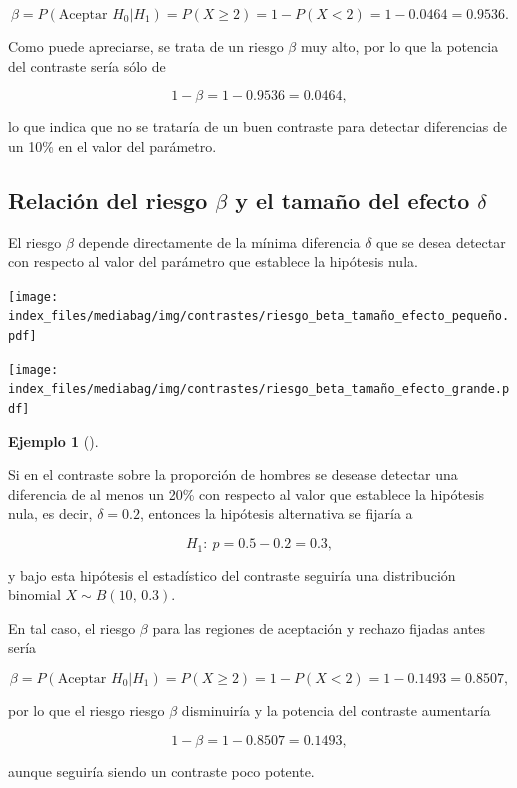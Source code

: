 \documentclass[
  a4paper,
]{scrreport}
\theoremstyle{plain}
\theoremstyle{definition}
\newtheorem{example}{Ejemplo}[chapter]
\theoremstyle{definition}
\theoremstyle{remark}
\begin{document}
\[\beta = P(\mbox{Aceptar }H_0|H_1) = P(X\geq 2) = 1 - P(X<2) = 1-0.0464 = 0.9536.\]

Como puede apreciarse, se trata de un riesgo \(\beta\) muy alto, por lo
que la potencia del contraste sería sólo de

\[1-\beta = 1-0.9536 = 0.0464,\]

lo que indica que no se trataría de un buen contraste para detectar
diferencias de un 10\% en el valor del parámetro.

\subsection{\texorpdfstring{Relación del riesgo \(\beta\) y el tamaño
del efecto
\(\delta\)}{Relación del riesgo \textbackslash beta y el tamaño del efecto \textbackslash delta}}\label{relaciuxf3n-del-riesgo-beta-y-el-tamauxf1o-del-efecto-delta}

El riesgo \(\beta\) depende directamente de la mínima diferencia
\(\delta\) que se desea detectar con respecto al valor del parámetro que
establece la hipótesis nula.

\begin{center}
\texttt{[image: index\_files/mediabag/img/contrastes/riesgo\_beta\_tamaño\_efecto\_pequeño.pdf]}
\end{center}

\begin{center}
\texttt{[image: index\_files/mediabag/img/contrastes/riesgo\_beta\_tamaño\_efecto\_grande.pdf]}
\end{center}

\begin{example}[]\protect\hypertarget{exm-potencia-contraste}{}\label{exm-potencia-contraste}

Si en el contraste sobre la proporción de hombres se desease detectar
una diferencia de al menos un 20\% con respecto al valor que establece
la hipótesis nula, es decir, \(\delta=0.2\), entonces la hipótesis
alternativa se fijaría a

\[H_1:\ p=0.5-0.2=0.3,\]

y bajo esta hipótesis el estadístico del contraste seguiría una
distribución binomial \(X\sim B(10,\,0.3)\).

En tal caso, el riesgo \(\beta\) para las regiones de aceptación y
rechazo fijadas antes sería

\[\beta = P(\mbox{Aceptar }H_0|H_1) = P(X\geq 2) = 1 - P(X<2) = 1-0.1493 = 0.8507,\]

por lo que el riesgo riesgo \(\beta\) disminuiría y la potencia del
contraste aumentaría

\[1-\beta = 1-0.8507 = 0.1493,\]

aunque seguiría siendo un contraste poco potente.

\end{example}
\end{document}

